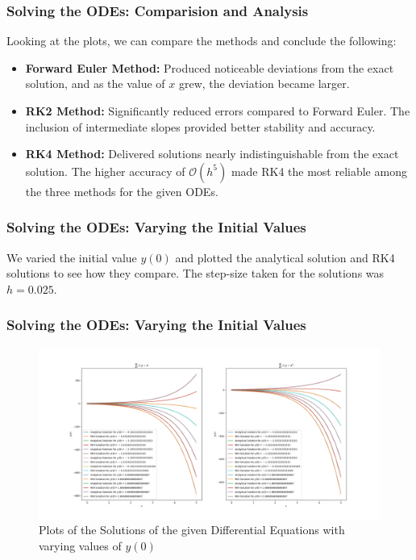 \documentclass{beamer}
\newcommand{\bigO}{\mathcal{O}}
\begin{document}
\begin{frame}
    \frametitle{Solving the ODEs: Comparision and Analysis}
    Looking at the plots, we can compare the methods and conclude the following:
    \begin{itemize}
        \item \textbf{Forward Euler Method:} Produced noticeable deviations from the exact solution, and as the value of $x$ grew, the
            deviation became larger.
        \item \textbf{RK2 Method:} Significantly reduced errors compared to Forward Euler. The inclusion of intermediate slopes provided better stability and accuracy.
        \item \textbf{RK4 Method:} Delivered solutions nearly indistinguishable from the exact solution. The higher accuracy of $\bigO(h^5)$ made RK4 the most reliable among the three methods for the given ODEs. 
    \end{itemize}
\end{frame}
\begin{frame}
    \frametitle{Solving the ODEs: Varying the Initial Values} 
    We varied the initial value $y(0)$ and plotted the analytical solution and RK4 solutions to see how they compare. 
    The step-size taken for the solutions was $h = 0.025$.
\end{frame}
\begin{frame}
    \frametitle{Solving the ODEs: Varying the Initial Values} 
    \begin{figure}[h]
        \centering
        \includegraphics[width=\linewidth]{"varied_initial_vals_RK4.png"}
        \caption{Plots of the Solutions of the given Differential Equations with varying values of $y(0)$}
    \end{figure}
\end{frame}
\end{document}
